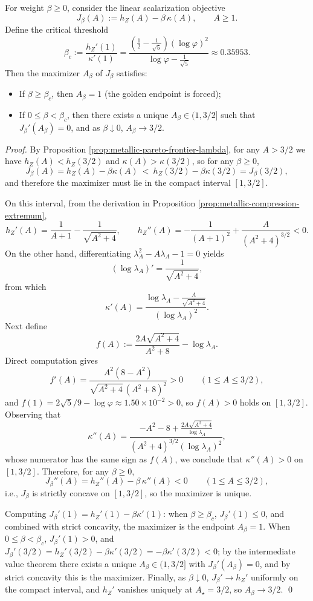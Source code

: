 \begin{proposition}\label{prop:metallic-linear-scalarization-threshold}
For weight \(\beta\ge 0\), consider the linear scalarization objective
\[
J_\beta(A):=h_Z(A)-\beta\,\kappa(A),\qquad A\ge 1.
\]
Define the critical threshold
\[
\beta_c:=\frac{h_Z'(1)}{\kappa'(1)}
=\frac{\left(\frac{1}{2}-\frac{1}{\sqrt5}\right)(\log\varphi)^2}{\log\varphi-\frac{1}{\sqrt5}}
\approx 0.35953.
\]
Then the maximizer \(A_\beta\) of \(J_\beta\) satisfies:
\begin{itemize}
  \item If \(\beta\ge \beta_c\), then \(A_\beta=1\) (the golden endpoint is forced);
  \item If \(0\le \beta<\beta_c\), then there exists a unique \(A_\beta\in(1,3/2]\) such that \(J_\beta'(A_\beta)=0\), and as \(\beta\downarrow 0\), \(A_\beta\to 3/2\).
\end{itemize}
\end{proposition}
\begin{proof}
By Proposition \ref{prop:metallic-pareto-frontier-lambda}, for any \(A>3/2\) we have \(h_Z(A)<h_Z(3/2)\) and \(\kappa(A)>\kappa(3/2)\), so for any \(\beta\ge 0\),
\[
J_\beta(A)=h_Z(A)-\beta\kappa(A)\ <\ h_Z(3/2)-\beta\kappa(3/2)=J_\beta(3/2),
\]
and therefore the maximizer must lie in the compact interval \([1,3/2]\).
\par
On this interval, from the derivation in Proposition \ref{prop:metallic-compression-extremum},
\[
h_Z'(A)=\frac{1}{A+1}-\frac{1}{\sqrt{A^2+4}},\qquad
h_Z''(A)=-\frac{1}{(A+1)^2}+\frac{A}{(A^2+4)^{3/2}}<0.
\]
On the other hand, differentiating \(\lambda_A^2-A\lambda_A-1=0\) yields
\[
(\log\lambda_A)'=\frac{1}{\sqrt{A^2+4}},
\]
from which
\[
\kappa'(A)=\frac{\log\lambda_A-\frac{A}{\sqrt{A^2+4}}}{(\log\lambda_A)^2}.
\]
Next define
\[
f(A):=\frac{2A\sqrt{A^2+4}}{A^2+8}-\log\lambda_A.
\]
Direct computation gives
\[
f'(A)=\frac{A^2(8-A^2)}{\sqrt{A^2+4}\,(A^2+8)^2}>0\qquad(1\le A\le 3/2),
\]
and \(f(1)=2\sqrt5/9-\log\varphi\approx 1.50\times 10^{-2}>0\), so \(f(A)>0\) holds on \([1,3/2]\).
Observing that
\[
\kappa''(A)=\frac{-A^2-8+\frac{2A\sqrt{A^2+4}}{\log\lambda_A}}{(A^2+4)^{3/2}(\log\lambda_A)^2},
\]
whose numerator has the same sign as \(f(A)\), we conclude that \(\kappa''(A)>0\) on \([1,3/2]\).
Therefore, for any \(\beta\ge 0\),
\[
J_\beta''(A)=h_Z''(A)-\beta\,\kappa''(A)<0\qquad(1\le A\le 3/2),
\]
i.e., \(J_\beta\) is strictly concave on \([1,3/2]\), so the maximizer is unique.
\par
Computing \(J_\beta'(1)=h_Z'(1)-\beta\kappa'(1)\): when \(\beta\ge\beta_c\), \(J_\beta'(1)\le 0\), and combined with strict concavity, the maximizer is the endpoint \(A_\beta=1\).
When \(0\le\beta<\beta_c\), \(J_\beta'(1)>0\), and \(J_\beta'(3/2)=h_Z'(3/2)-\beta\kappa'(3/2)=-\beta\kappa'(3/2)<0\); by the intermediate value theorem there exists a unique \(A_\beta\in(1,3/2]\) with \(J_\beta'(A_\beta)=0\), and by strict concavity this is the maximizer.
Finally, as \(\beta\downarrow 0\), \(J_\beta'\to h_Z'\) uniformly on the compact interval, and \(h_Z'\) vanishes uniquely at \(A_\star=3/2\), so \(A_\beta\to 3/2\). \qed
\end{proof}


